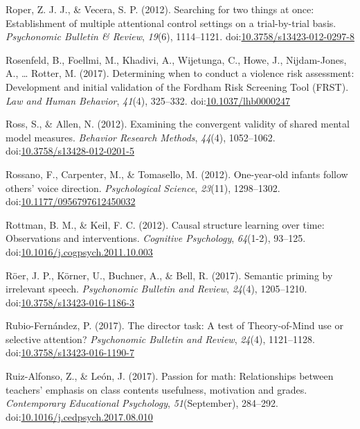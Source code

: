 \documentclass[english,man]{apa6}
\begin{document}
\hypertarget{ref-Roper2012}{}
Roper, Z. J. J., \& Vecera, S. P. (2012). Searching for two things at
once: Establishment of multiple attentional control settings on a
trial-by-trial basis. \emph{Psychonomic Bulletin \& Review},
\emph{19}(6), 1114--1121.
doi:\href{https://doi.org/10.3758/s13423-012-0297-8}{10.3758/s13423-012-0297-8}

\hypertarget{ref-Rosenfeld2017}{}
Rosenfeld, B., Foellmi, M., Khadivi, A., Wijetunga, C., Howe, J.,
Nijdam-Jones, A., \ldots{} Rotter, M. (2017). Determining when to
conduct a violence risk assessment: Development and initial validation
of the Fordham Risk Screening Tool (FRST). \emph{Law and Human
Behavior}, \emph{41}(4), 325--332.
doi:\href{https://doi.org/10.1037/lhb0000247}{10.1037/lhb0000247}

\hypertarget{ref-Ross2012}{}
Ross, S., \& Allen, N. (2012). Examining the convergent validity of
shared mental model measures. \emph{Behavior Research Methods},
\emph{44}(4), 1052--1062.
doi:\href{https://doi.org/10.3758/s13428-012-0201-5}{10.3758/s13428-012-0201-5}

\hypertarget{ref-Rossano2012}{}
Rossano, F., Carpenter, M., \& Tomasello, M. (2012). One-year-old
infants follow others' voice direction. \emph{Psychological Science},
\emph{23}(11), 1298--1302.
doi:\href{https://doi.org/10.1177/0956797612450032}{10.1177/0956797612450032}

\hypertarget{ref-Rottman2012}{}
Rottman, B. M., \& Keil, F. C. (2012). Causal structure learning over
time: Observations and interventions. \emph{Cognitive Psychology},
\emph{64}(1-2), 93--125.
doi:\href{https://doi.org/10.1016/j.cogpsych.2011.10.003}{10.1016/j.cogpsych.2011.10.003}

\hypertarget{ref-Roer2016}{}
Röer, J. P., Körner, U., Buchner, A., \& Bell, R. (2017). Semantic
priming by irrelevant speech. \emph{Psychonomic Bulletin and Review},
\emph{24}(4), 1205--1210.
doi:\href{https://doi.org/10.3758/s13423-016-1186-3}{10.3758/s13423-016-1186-3}

\hypertarget{ref-Rubio-Fernandez2016}{}
Rubio-Fernández, P. (2017). The director task: A test of Theory-of-Mind
use or selective attention? \emph{Psychonomic Bulletin and Review},
\emph{24}(4), 1121--1128.
doi:\href{https://doi.org/10.3758/s13423-016-1190-7}{10.3758/s13423-016-1190-7}

\hypertarget{ref-Ruiz-Alfonso2017}{}
Ruiz-Alfonso, Z., \& León, J. (2017). Passion for math: Relationships
between teachers' emphasis on class contents usefulness, motivation and
grades. \emph{Contemporary Educational Psychology},
\emph{51}(September), 284--292.
doi:\href{https://doi.org/10.1016/j.cedpsych.2017.08.010}{10.1016/j.cedpsych.2017.08.010}
\end{document}
